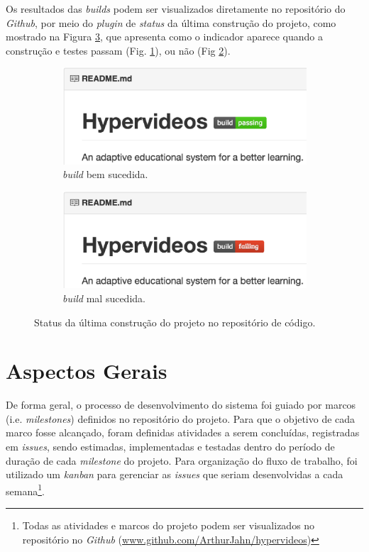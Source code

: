 Os resultados das \textit{builds} podem ser visualizados diretamente no repositório do \textit{Github}, por meio do \textit{plugin} de \textit{status} da última construção do projeto, como mostrado na Figura \ref{fig:status}, que apresenta como o indicador aparece quando a construção e testes passam (Fig. \ref{fig:status_a}), ou não (Fig \ref{fig:status_b}).

\begin{figure}[h!]
  	\centering
  	\begin{subfigure}{.4\textwidth}
  		\centering
  		\includegraphics[width=.9\linewidth]{figuras/build_passing.eps}
  		\caption{\textit{build} bem sucedida.}
  		\label{fig:status_a}
	\end{subfigure}%
	\begin{subfigure}{.4\textwidth}
  		\centering
  		\includegraphics[width=.9\linewidth]{figuras/build_failure.eps}
		\caption{\textit{build} mal sucedida.}
  		\label{fig:status_b}
	\end{subfigure}%
  	\caption{Status da última construção do projeto no repositório de código.}
  	\label{fig:status}
\end{figure}
 
\section{Aspectos Gerais} 

De forma geral, o processo de desenvolvimento do sistema foi guiado por marcos (i.e. \textit{milestones}) definidos no repositório do projeto. Para que o objetivo de cada marco fosse alcançado, foram definidas atividades a serem concluídas, registradas em \textit{issues}, sendo estimadas, implementadas e testadas dentro do período de duração de cada \textit{milestone} do projeto. Para organização do fluxo de trabalho, foi utilizado um \textit{kanban} para gerenciar as \textit{issues} que seriam desenvolvidas a cada semana\footnote{ Todas as atividades e marcos do projeto podem ser visualizados no repositório no \textit{Github} (\url{www.github.com/ArthurJahn/hypervideos})}.

